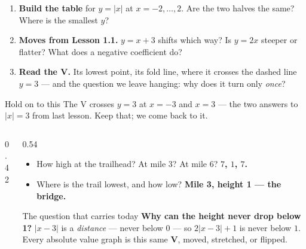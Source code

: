 \documentclass[aspectratio=169, 11pt]{beamer}
\newcommand{\lgrid}[4]{%
  \draw[step=1, linegray!40, very thin] (#1,#3) grid (#2,#4);
  \draw[->, thick, charcoal] (#1,0)--(#2,0) node[below right, font=\tiny]{$x$};
  \draw[->, thick, charcoal] (0,#3)--(0,#4) node[left, font=\tiny]{$y$};}
\begin{document}
\begin{frame}[t, plain]
  \begin{enumerate}\setlength{\itemsep}{7pt}
    \item \textbf{Build the table} for $y=|x|$ at $x=-2,\dots,2$. Are the two halves the same?
          Where is the smallest $y$?
    \item \textbf{Moves from Lesson 1.1.} $y=x+3$ shifts which way? Is $y=2x$ steeper or flatter?
          What does a negative coefficient do?
    \item \textbf{Read the V.} Its lowest point, its fold line, where it crosses the dashed line
          $y=3$ --- and the question we leave hanging: why does it turn only \emph{once}?
  \end{enumerate}
  \vspace{6pt}
  \begin{block}{Hold on to this}
    The V crosses $y=3$ at $x=-3$ and $x=3$ --- the two answers to $|x|=3$ from last lesson.
    Keep that; we come back to it.
  \end{block}
\end{frame}

\begin{frame}[t, plain]
  \begin{columns}[T]
    \begin{column}{0.42\textwidth}
      \centering
    \end{column}
    \begin{column}{0.54\textwidth}
      \begin{itemize}\setlength{\itemsep}{5pt}
        \item How high at the trailhead? At mile 3? At mile 6? \; \textbf{$7$, $1$, $7$.}
        \item Where is the trail lowest, and how low? \; \textbf{Mile 3, height 1 --- the bridge.}
      \end{itemize}
      \vspace{4pt}
      \begin{block}{The question that carries today}
        \textbf{Why can the height never drop below 1?} $|x-3|$ is a \emph{distance} --- never
        below $0$ --- so $2|x-3|+1$ is never below $1$. Every absolute value graph is this same
        \textbf{V}, moved, stretched, or flipped.
      \end{block}
    \end{column}
  \end{columns}
\end{frame}
\end{document}
